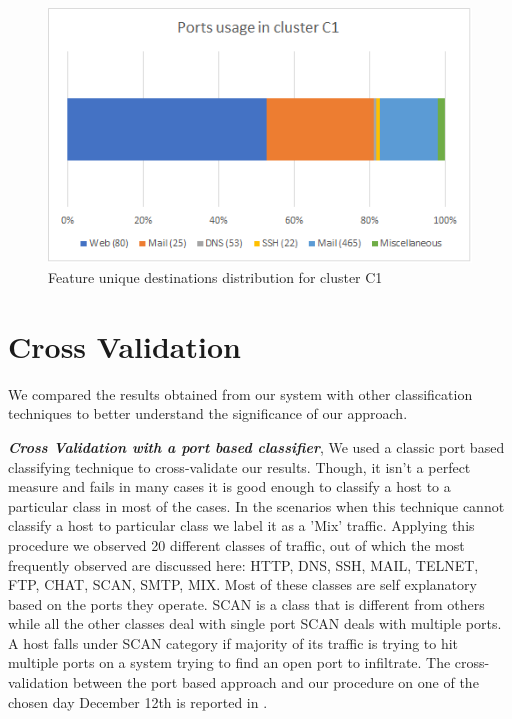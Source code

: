 \begin{figure}[t]
	\centerline{
		\includegraphics[scale = 1.0]{c1_ports.png}
	}
	\caption{Feature unique destinations distribution for cluster C1}%
\end{figure}





\section{Cross Validation} \label{cross_validation}
We compared the results obtained from our system with other classification techniques to better understand the significance of our approach.

\textbf{\textit{Cross Validation with a port based classifier}}, We used a classic port based classifying technique to cross-validate our results. Though, it isn't a perfect measure and fails in many cases it is good enough to classify a host to a particular class in most of the cases.
In the scenarios when this technique cannot classify a host to particular class we label it as a 'Mix' traffic. Applying this procedure we observed 20 different classes of traffic, out of which the most frequently observed are discussed here: HTTP, DNS, SSH, MAIL, TELNET, FTP, CHAT, SCAN, SMTP, MIX. Most of these classes are self explanatory based on the ports they operate. SCAN is a class that is different from others while all the other classes deal with single port SCAN deals with multiple ports. A host falls under SCAN category if majority of its traffic is trying to hit multiple ports on a system trying to find an open port to infiltrate. The cross-validation between the port based approach and our procedure on one of the chosen day December 12th is reported in .


